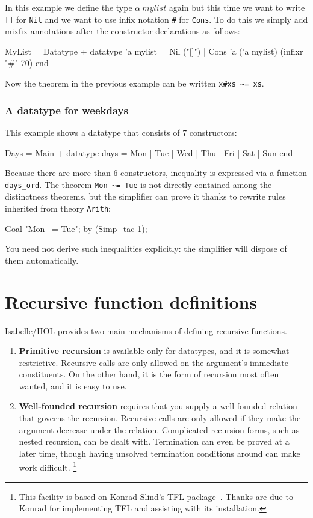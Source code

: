 In this example we define the type $\alpha~mylist$ again but this time
we want to write \texttt{[]} for \texttt{Nil} and we want to use infix
notation \verb|#| for \texttt{Cons}.  To do this we simply add mixfix
annotations after the constructor declarations as follows:
\begin{ttbox}
MyList = Datatype +
  datatype 'a mylist =
    Nil ("[]")  |
    Cons 'a ('a mylist)  (infixr "#" 70)
end
\end{ttbox}
Now the theorem in the previous example can be written \verb|x#xs ~= xs|.


\subsubsection{A datatype for weekdays}

This example shows a datatype that consists of 7 constructors:
\begin{ttbox}
Days = Main +
  datatype days = Mon | Tue | Wed | Thu | Fri | Sat | Sun
end
\end{ttbox}
Because there are more than 6 constructors, inequality is expressed via a function
\verb|days_ord|.  The theorem \verb|Mon ~= Tue| is not directly
contained among the distinctness theorems, but the simplifier can
prove it thanks to rewrite rules inherited from theory \texttt{Arith}:
\begin{ttbox}
Goal "Mon ~= Tue";
by (Simp_tac 1);
\end{ttbox}
You need not derive such inequalities explicitly: the simplifier will dispose
of them automatically.


\section{Recursive function definitions}\label{sec:HOL:recursive}

Isabelle/HOL provides two main mechanisms of defining recursive functions.
\begin{enumerate}
\item \textbf{Primitive recursion} is available only for datatypes, and it is
  somewhat restrictive.  Recursive calls are only allowed on the argument's
  immediate constituents.  On the other hand, it is the form of recursion most
  often wanted, and it is easy to use.
  
\item \textbf{Well-founded recursion} requires that you supply a well-founded
  relation that governs the recursion.  Recursive calls are only allowed if
  they make the argument decrease under the relation.  Complicated recursion
  forms, such as nested recursion, can be dealt with.  Termination can even be
  proved at a later time, though having unsolved termination conditions around
  can make work difficult.%
  \footnote{This facility is based on Konrad Slind's TFL
    package~\cite{slind-tfl}.  Thanks are due to Konrad for implementing TFL
    and assisting with its installation.}
\end{enumerate}

